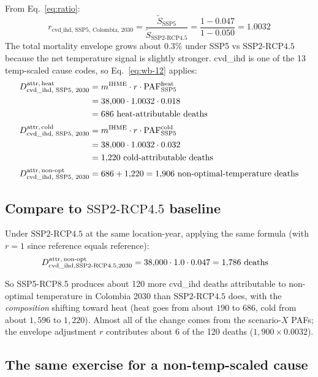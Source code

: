 \documentclass[11pt]{article}
\newcommand{\PAF}{\text{PAF}}
\newcommand{\SSPtwo}{\text{SSP2{-}RCP4.5}}
\newcommand{\mIHME}{m^{\text{IHME}}}
\begin{document}
From Eq.~\eqref{eq:ratio}:
\[
r_{\text{cvd\_ihd, SSP5, Colombia, 2030}}
= \frac{\tilde S_{\text{SSP5}}}{\tilde S_{\SSPtwo}}
= \frac{1 - 0.047}{1 - 0.050}
= 1.0032
\]
The total mortality envelope grows about 0.3\% under SSP5 vs $\SSPtwo$
because the net temperature signal is slightly stronger. cvd\_ihd
is one of the 13 temp-scaled cause codes, so Eq.~\eqref{eq:wb-12} applies:
\begin{align*}
\mAttr[heat]_{\text{cvd\_ihd, SSP5, 2030}}
&= \mIHME \cdot r \cdot \PAF^{\text{heat}}_{\text{SSP5}} \\
&= 38{,}000 \cdot 1.0032 \cdot 0.018 \\
&= 686 \text{ heat-attributable deaths} \\[2pt]
\mAttr[cold]_{\text{cvd\_ihd, SSP5, 2030}}
&= \mIHME \cdot r \cdot \PAF^{\text{cold}}_{\text{SSP5}} \\
&= 38{,}000 \cdot 1.0032 \cdot 0.032 \\
&= 1{,}220 \text{ cold-attributable deaths} \\[2pt]
\mAttr[non-opt]_{\text{cvd\_ihd, SSP5, 2030}}
&= 686 + 1{,}220 = 1{,}906 \text{ non-optimal-temperature deaths}
\end{align*}

\subsection{Compare to $\SSPtwo$ baseline}

Under $\SSPtwo$ at the same location-year, applying the same formula
(with $r = 1$ since reference equals reference):
\begin{align*}
\mAttr[non-opt]_{\text{cvd\_ihd}, \SSPtwo, 2030}
&= 38{,}000 \cdot 1.0 \cdot 0.047
= 1{,}786 \text{ deaths}
\end{align*}

So SSP5-RCP8.5 produces about 120 more cvd\_ihd deaths attributable to
non-optimal temperature in Colombia 2030 than $\SSPtwo$ does, with the
\emph{composition} shifting toward heat (heat goes from about $190$ to
$686$, cold from about $1{,}596$ to $1{,}220$). Almost all of the change
comes from the scenario-$X$ PAFs; the envelope adjustment $r$ contributes
about 6 of the 120 deaths ($1{,}900 \times 0.0032$).

\subsection{The same exercise for a non-temp-scaled cause}
\end{document}
